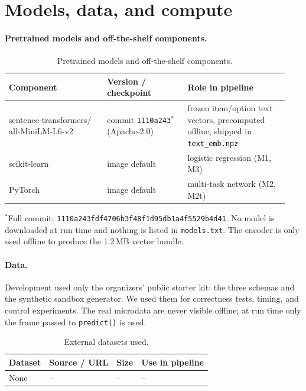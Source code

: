 \documentclass{article}
\begin{document}
\section{Models, data, and compute}
\label{sec:resources}

\paragraph{Pretrained models and off-the-shelf components.}

\begin{table}[h]
  \centering
  \small
  \caption{Pretrained models and off-the-shelf components.}
  \label{tab:models}
  \begin{tabular}{@{}p{0.33\linewidth}p{0.27\linewidth}p{0.34\linewidth}@{}}
    \toprule
    Component & Version / checkpoint & Role in pipeline  \\
    \midrule
    sentence-transformers/ all-MiniLM-L6-v2 & commit \texttt{1110a243}$^{\ast}$ (Apache-2.0) & frozen item/option text vectors, precomputed offline, shipped in \texttt{text\_emb.npz} \\
    scikit-learn & image default & logistic regression (M1, M3) \\
    PyTorch & image default & multi-task network (M2, M2t) \\
    \bottomrule
  \end{tabular}
\end{table}
$^{\ast}$Full commit: \texttt{1110a243fdf4706b3f48f1d95db1a4f5529b4d41}. No model is downloaded at run time and nothing is listed in \texttt{models.txt}. The encoder is only used offline to produce the 1.2\,MB vector bundle.

\paragraph{Data.} Development used only the organizers' public starter kit: the three schemas and the synthetic sandbox generator. We used them for correctness tests, timing, and control experiments. The real microdata are never visible offline; at run time only the frame passed to \texttt{predict()} is used.

\begin{table}[h]
  \centering
  \caption{External datasets used.}
  \label{tab:external}
  \begin{tabular}{llll}
    \toprule
    Dataset & Source / URL & Size & Use in pipeline \\
    \midrule
    None & -- & -- & -- \\
    \bottomrule
  \end{tabular}
\end{table}
\end{document}
